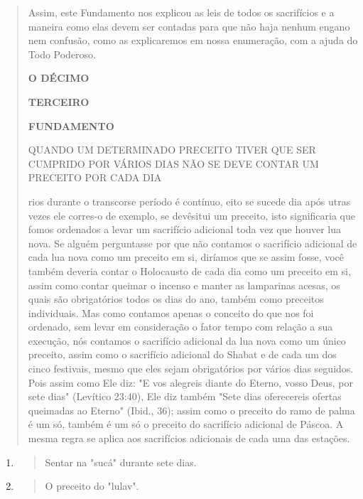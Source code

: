 \begin{quote}
Assim, este Fundamento nos explicou as leis de todos os sacrifícios e a
maneira como elas devem ser contadas para que não haja nenhum engano nem
confusão, como as explicaremos em nossa enumeração, com a ajuda do Todo
Poderoso.

\textbf{O DÉCIMO}

\textbf{TERCEIRO}

\textbf{FUNDAMENTO}

QUANDO UM DETERMINADO PRECEITO TIVER QUE SER CUMPRIDO POR VÁRIOS DIAS
NÃO SE DEVE CONTAR UM PRECEITO POR CADA DIA

rios durante o transcor­se período é contínuo, eito se sucede dia após
utras vezes ele corres-o de exemplo, se devês­itui um preceito, isto
sig­nificaria que fomos ordenados a levar um sacrifício adicional toda
vez que hou­ver lua nova. Se alguém perguntasse por que não contamos o
sacrifício adicional de cada lua nova como um preceito em si, diríamos
que se assim fosse, você tam­bém deveria contar o Holocausto de cada dia
como um preceito em si, assim como contar queimar o incenso e manter as
lamparinas acesas, os quais são obri­gatórios todos os dias do ano,
também como preceitos individuais. Mas como contamos apenas o conceito
do que nos foi ordenado, sem levar em considera­ção o fator tempo com
relação a sua execução, nós contamos o sacrifício adicio­nal da lua nova
como um único preceito, assim como o sacrifício adicional do Shabat e de
cada um dos cinco festivais, mesmo que eles sejam obrigatórios por
vários dias seguidos. Pois assim como Ele diz: "E vos alegreis diante do
Eterno, vosso Deus, por sete dias" (Levítico 23:40), Ele diz também
"Sete dias oferece­reis ofertas queimadas ao Eterno" (Ibid., 36); assim
como o preceito do ramo de palma é um só, também é um só o preceito do
sacrifício adicional de Páscoa. A mesma regra se aplica aos sacrifícios
adicionais de cada uma das estações.
\end{quote}

\begin{enumerate}
\def\labelenumi{\arabic{enumi}.}
\setcounter{enumi}{22}
\item
  \begin{quote}
  Sentar na "sucá" durante sete dias.
  \end{quote}
\item
  \begin{quote}
  O preceito do "lulav".
  \end{quote}
\end{enumerate}

